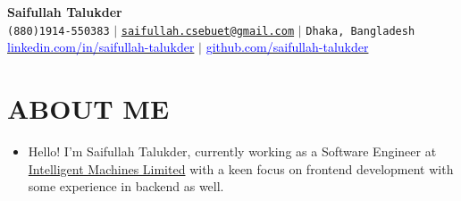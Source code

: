 \documentclass[letterpaper,10pt]{article}
\newcommand{\resumeItem}[1]{
  \item\small{
    {#1 \vspace{-1pt}}
  }
}
\begin{document}
\begin{center}
    \textbf{\Huge Saifullah Talukder} \\ \vspace{5pt}
    \small \faPhone* \texttt{(880)1914-550383} \hspace{1pt} $|$
    \hspace{1pt} \faEnvelope \hspace{2pt} \texttt{\href{mailto:saifullah.cse16.buet@gmail.com}{saifullah.csebuet@gmail.com}} \hspace{1pt} $|$ 
    \hspace{1pt} \faMapMarker* \hspace{2pt}\texttt{Dhaka, Bangladesh}
    \\ \vspace{5pt}
    \hspace{1pt} \faLinkedin \hspace{2pt} \href{https://www.linkedin.com/in/saifullah-talukder}{\textcolor{blue}{linkedin.com/in/saifullah-talukder}} \hspace{1pt} $|$
    \hspace{1pt} \faGithub \hspace{2pt} \href{https://github.com/saifullah-talukder}{\textcolor{blue}{github.com/saifullah-talukder}} \hspace{1pt} %
    \\ \vspace{-5pt}
\end{center}

\section{ABOUT ME}
 \begin{itemize}[leftmargin=0in, label={}]
    \resumeItem {Hello! I'm Saifullah Talukder, currently working as a Software Engineer at {\textcolor{blue}{\href{https://bangladesh.ai/}{Intelligent Machines Limited}}} with a keen focus on frontend development with some experience in backend as well.}
    
 \end{itemize}

\end{document}
